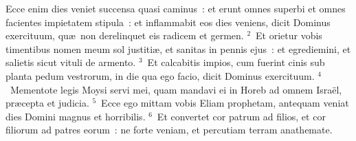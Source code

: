 \lettrine[lines=3,image=true,loversize=0.05,lraise=-0.03]{E}{}cce enim dies veniet succensa quasi caminus~: et erunt omnes superbi et omnes facientes impietatem stipula~: et inflammabit eos dies veniens, dicit Dominus exercituum, qu\ae\ non derelinquet eis radicem et germen.
${}^{2}$~Et orietur vobis timentibus nomen meum sol justiti\ae , et sanitas in pennis ejus~: et egrediemini, et salietis sicut vituli de armento.
${}^{3}$~Et calcabitis impios, cum fuerint cinis sub planta pedum vestrorum, in die qua ego facio, dicit Dominus exercituum.
${}^{4}$~Mementote legis Moysi servi mei, quam mandavi ei in Horeb ad omnem Isra\"el, pr\ae cepta et judicia.
${}^{5}$~Ecce ego mittam vobis Eliam prophetam, antequam veniat dies Domini magnus et horribilis.
${}^{6}$~Et convertet cor patrum ad filios, et cor filiorum ad patres eorum~: ne forte veniam, et percutiam terram anathemate.
